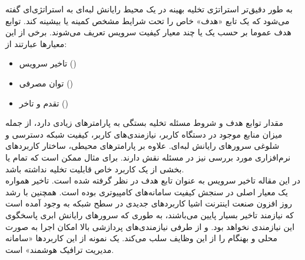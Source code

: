 به طور دقیق‌تر استراتژی تخلیه بهینه در یک محیط رایانش لبه‌ای به استراتژی‌ای گفته می‌شود که یک تابع «هدف» خاص را تحت شرایط مشخص کمینه یا بیشینه کند. توابع هدف عموما بر حسب یک یا چند معیار کیفیت سرویس تعریف می‌شوند. برخی از این معیارها عبارتند از:
\begin{itemize}
	\item تاخیر سرویس ()
	\item توان مصرفی ()
	\item تقدم و تاخر ()
\end{itemize}

مقدار توابع هدف و شروط مسئله تخلیه بستگی به پارامترهای زیادی دارد، از جمله میزان منابع موجود در دستگاه کاربر، نیازمندی‌های کاربر، کیفیت شبکه دسترسی و شلوغی سرورهای رایانش لبه‌ای. علاوه بر پارامترهای محیطی، ساختار کاربردهای نرم‌افزاری مورد بررسی نیز در مسئله نقش دارند. برای مثال ممکن است که تمام یا بخشی از یک کاربرد خاص قابلیت تخلیه نداشته باشد.  \\

در این مقاله تاخیر سرویس به عنوان تابع هدف در نظر گرفته شده است. تاخیر همواره یک معیار اصلی در سنجش کیفیت سامانه‌های کامپیوتری بوده است. همچنین با رشد روز افزون صنعت اینترنت اشیا کاربردهای جدیدی در سطح شبکه به وجود آمده است که نیازمند تاخیر بسیار پایین می‌باشند، به طوری که سرورهای رایانش ابری پاسخگوی این نیازمندی نخواهد بود. و از طرفی نیازمندی‌های پردازشی بالا امکان اجرا به صورت محلی و بهنگام را از این وظایف سلب می‌کند. یک نمونه از این کاربردها «سامانه مدیریت ترافیک هوشمند» است. \\

